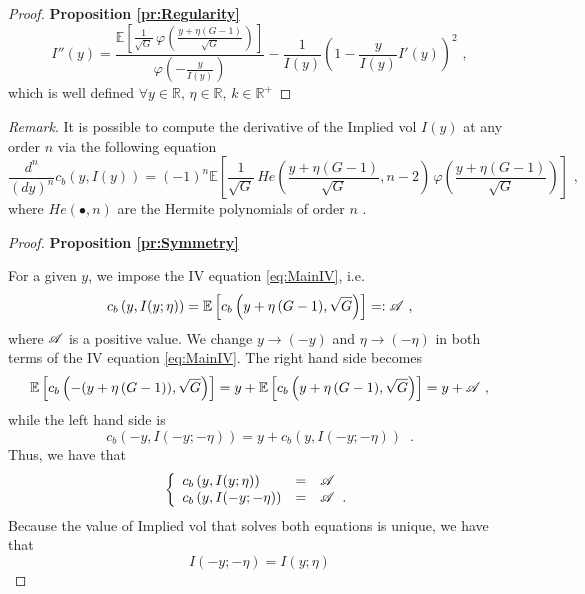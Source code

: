 \documentclass[12pt]{article}
\theoremstyle{definition}
\theoremstyle{remark}
\numberwithin{theorem}{section}
\numberwithin{proposition}{section}
\numberwithin{lemma}{section}
\numberwithin{corollary}{section}
\numberwithin{definition}{section}
\numberwithin{remark}{section}
\numberwithin{example}{section}
\newcommand{\E}{\mathbb{E}}
\begin{document}
\begin{proof}{\bf Proposition \ref{pr:Regularity}}
\begin{equation}
\label{eq:I_second}
    I''(y)= \displaystyle
     \frac{\mathbb{E}\left[\frac{1}{\sqrt{G}} \, \varphi\left(\frac{y+\eta(G-1)}{\sqrt{G}}\right)\right]}{\varphi\left(-\frac{y}{I(y)}\right)}
     -\frac{1}{I(y)}\left(1-\frac{y}{I(y)}I'(y)\right)^2\,\,,
\end{equation}
which is well defined $\forall y\in\mathbb{R},\,\eta\in\mathbb{R},\,k\in\mathbb{R}^+$
\end{proof}
{\it Remark}.
It is possible to compute the derivative of the Implied vol $I(y)$ at any order $n$ via the following equation
\[
\frac{d^n}{(dy)^n} c_b \left(y, I(y) \right) = 
(-1)^n  \mathbb{E}\left[\frac{1}{\sqrt{G}} \, He\left(\frac{y+\eta(G-1)}{\sqrt{G}}, n-2\right) \, \varphi\left(\frac{y+\eta(G-1)}{\sqrt{G}}\right)\right]\,\,,
\]
where $He\left( \bullet , n\right)$ are the Hermite polynomials of order $n$ \citep[see, e.g.,][Ch.22]{abramowitz1948handbook}.

\smallskip

\begin{proof} {\bf Proposition \ref{pr:Symmetry}}

For a given $y$, we impose the IV equation \eqref{eq:MainIV}, i.e.
\[
{c_b\left( y, {I}(y;\eta)\right)}  =  \E \left[ c_b\left(y+  \eta \, (G -1) , \sqrt{G}\right) \right]  =: {\cal A}\,\,,
\]
where ${\cal A}$ is a positive value.
We change $y \to (-y)$ and $\eta \to (-\eta)$ in both terms of the IV equation \eqref{eq:MainIV}.
The right hand side becomes
\[
 \E \left[ c_b\left( -(y+  \eta \, (G -1)) , \sqrt{G}\right) \right] =
 y +  \E \left[ c_b\left( y+  \eta \, (G -1) , \sqrt{G}\right) \right] = y + {\cal A}\,\,,
\] 
while the left hand side is
\[
 {c_b\left( -y, {I}(-y;-\eta)\right)}  = y +  {c_b\left( y, {I}(-y;-\eta)\right)}  \;\; .
\]
Thus, we have that
\[
\left\{
\begin{array} {lcl}
{c_b\left( y, {I}(y;\eta)\right)}  &=&  {\cal A} \\
{c_b\left( y, {I}(-y;-\eta)\right)}  & = & {\cal A}  \;\; .
\end{array}
\right.
\]
Because the value of Implied vol that solves both equations is unique, we have that
\[
I(-y;-\eta) = I(y;\eta)
\]
\end{proof}
\end{document}
